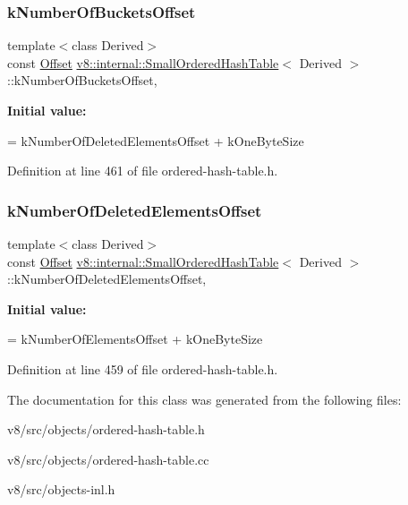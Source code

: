 \subsubsection{\texorpdfstring{k\+Number\+Of\+Buckets\+Offset}{kNumberOfBucketsOffset}}
{\footnotesize\ttfamily template$<$class Derived$>$ \\
const \mbox{\hyperlink{classint}{Offset}} \mbox{\hyperlink{classv8_1_1internal_1_1SmallOrderedHashTable}{v8\+::internal\+::\+Small\+Ordered\+Hash\+Table}}$<$ Derived $>$\+::k\+Number\+Of\+Buckets\+Offset\hspace{0.3cm}{\ttfamily [static]}, {\ttfamily [protected]}}

{\bfseries Initial value\+:}
\begin{DoxyCode}
=
      kNumberOfDeletedElementsOffset + kOneByteSize
\end{DoxyCode}


Definition at line 461 of file ordered-\/hash-\/table.\+h.

\mbox{\label{classv8_1_1internal_1_1SmallOrderedHashTable_ad4b74290e748fed2c615ef434a1fcee1}} 
\subsubsection{\texorpdfstring{k\+Number\+Of\+Deleted\+Elements\+Offset}{kNumberOfDeletedElementsOffset}}
{\footnotesize\ttfamily template$<$class Derived$>$ \\
const \mbox{\hyperlink{classint}{Offset}} \mbox{\hyperlink{classv8_1_1internal_1_1SmallOrderedHashTable}{v8\+::internal\+::\+Small\+Ordered\+Hash\+Table}}$<$ Derived $>$\+::k\+Number\+Of\+Deleted\+Elements\+Offset\hspace{0.3cm}{\ttfamily [static]}, {\ttfamily [protected]}}

{\bfseries Initial value\+:}
\begin{DoxyCode}
=
      kNumberOfElementsOffset + kOneByteSize
\end{DoxyCode}


Definition at line 459 of file ordered-\/hash-\/table.\+h.



The documentation for this class was generated from the following files\+:\begin{DoxyCompactItemize}
\item 
v8/src/objects/ordered-\/hash-\/table.\+h\item 
v8/src/objects/ordered-\/hash-\/table.\+cc\item 
v8/src/objects-\/inl.\+h\end{DoxyCompactItemize}
